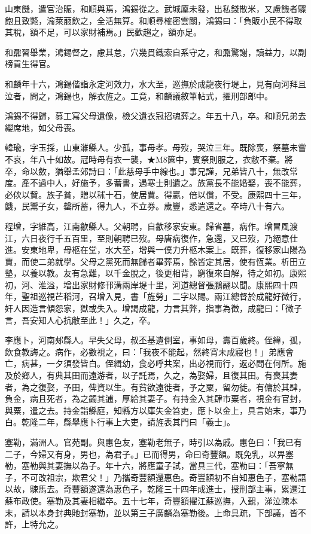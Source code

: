 \begin{pinyinscope}
山東饑，遣官治賑，和順與焉，鴻錫從之。武城廩未發，出私錢散米，又慮饑者驟飽且致斃，瀹萊菔飲之，全活無算。和順尋榷密雲關，鴻錫曰：「負販小民不得取其稅，額不足，可以家財補焉。」民歡趨之，額亦足。

和鼐習舉業，鴻錫督之，慮其怠，穴幾貫鐵索自系守之，和鼐驚謝，讀益力，以副榜貢生得官。

和麟年十六，鴻錫偕詣永定河效力，水大至，巡撫於成龍夜行堤上，見有向河拜且泣者，問之，鴻錫也，解衣旌之。工竟，和麟議敘筆帖式，擢刑部郎中。

鴻錫不得歸，募工寫父母遺像，檢父遺衣冠招魂葬之。年五十八，卒。和順兄弟去纓席地，如父母喪。

韓瑜，字玉採，山東濰縣人。少孤，事母孝。母歿，哭泣三年。既除喪，祭墓未嘗不哀，年八十如故。冠時母有衣一襲，★M8篋中，賓祭則服之，衣敝不棄。將卒，命以斂，猶舉孟郊詩曰：「此慈母手中線也。」事兄謹，兄弟皆八十，無改常度。產不過中人，好施予，多蓄書，遇寒士則遺之。族黨長不能婚娶，喪不能葬，必佽以貲。族子貧，贈以秫十石，使居賈。得贏，倍以償，不受。康熙四十三年，饑，民鬻子女，罄所蓄，得九人，不立券。歲豐，悉遣還之。卒時八十有六。

程增，字維高，江南歙縣人。父朝聘，自歙移家安東。歸省墓，病作。增冒風渡江，六日夜行千五百里，至則朝聘已歿。母唐病復作，急還，又已歿，乃絕意仕進。安東地卑，母柩在堂，水大至，增與一僕力升柩木案上。既葬，復移家山陽為賈，而使二弟就學。父母之黨死而無歸者畢葬焉，餘皆定其居，使有恆業。析田立塾，以養以教。友有急難，以千金脫之，後更相背，窮復來自解，待之如初。康熙初，河、淮溢，增出家財修邗溝兩岸堤十里，河道總督張鵬翮以聞。康熙四十四年，聖祖巡視芒稻河，召增入見，書「旌勞」二字以賜。兩江總督於成龍好微行，奸人因造言傾怨家，獄或失入。增謁成龍，力言其弊，指事為徵，成龍曰：「微子言，吾安知人心抗敝至此！」久之，卒。

李應卜，河南郟縣人。早失父母，叔丕基遺側室，事如母，壽百歲終。侄緯，孤，飲食教誨之。病作，必數視之，曰：「我夜不能起，然終宵未成寢也！」弟應會亡，病甚，一夕須發皆白。侄緝幼，食必呼共案，出必視而行，返必問在何所。施及於鄉人，有典其田而遠游者，以子託焉，久之，為娶婦，且復其田。有喪其妻者，為之復娶，予田，俾資以生。有貧欲遠徙者，予之粟，留勿徙。有傭於其肆，負金，病且死者，為之蠲其逋，厚給其妻子。有持金入其肆市粟者，視金有官封，與粟，遣之去。持金詣縣庭，知縣方以庫失金笞吏，應卜以金上，具言始末，事乃白。乾隆二年，縣舉應卜行事上大吏，請旌表其門曰「義士」。

塞勒，滿洲人。官苑副。與惠色友，塞勒老無子，時引以為戚。惠色曰：「我已有二子，今婦又有身，男也，為君子。」已而得男，命曰奇豐額。既免乳，以畀塞勒，塞勒與其妻撫以為子。年十六，將應童子試，當具三代，塞勒曰：「吾寧無子，不可改祖宗，欺君父！」乃攜奇豐額還惠色。奇豐額初不自知惠色子，塞勒語以故，駷馬去。奇豐額遂還為惠色子，乾隆三十四年成進士，授刑部主事，累遷江蘇布政使。塞勒及其妻相繼卒。五十七年，奇豐額擢江蘇巡撫，入覲，涕泣陳本末，請以本身封典貤封塞勒，並以第三子廣麟為塞勒後。上命具疏，下部議，皆不許，上特允之。


\end{pinyinscope}
